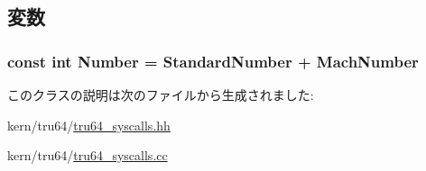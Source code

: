 \subsection{変数}
\hypertarget{classSystemCalls_3_01Tru64_01_4_af34243ce3f8a4ba0ce3745d32a76ed1f}{
\subsubsection[{Number}]{\setlength{\rightskip}{0pt plus 5cm}const int {\bf Number} = StandardNumber + MachNumber}}
\label{classSystemCalls_3_01Tru64_01_4_af34243ce3f8a4ba0ce3745d32a76ed1f}


このクラスの説明は次のファイルから生成されました:\begin{DoxyCompactItemize}
\item 
kern/tru64/\hyperlink{tru64__syscalls_8hh}{tru64\_\-syscalls.hh}\item 
kern/tru64/\hyperlink{tru64__syscalls_8cc}{tru64\_\-syscalls.cc}\end{DoxyCompactItemize}
